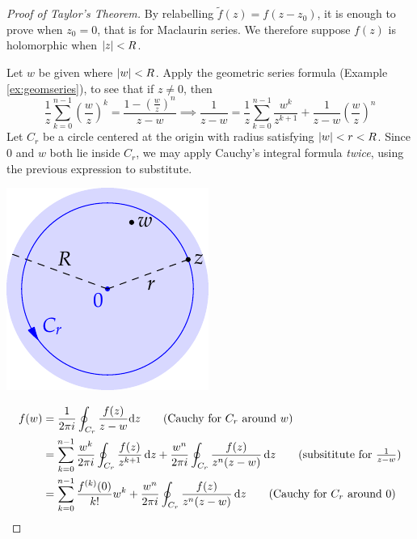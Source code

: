 \begin{proof}[Proof of Taylor's Theorem]
	By relabelling $\tilde f(z)=f(z-z_0)$, it is enough to prove when $z_0=0$, that is for Maclaurin series. We therefore suppose $f(z)$ is holomorphic when $\left| z\right|<R$.\par
	\begin{minipage}[t]{0.74\linewidth}\vspace{-2pt}
		Let $w$ be given where $\left| w\right|<R$. Apply the geometric series formula (Example \ref{ex:geomseries}), to see that if $z\neq 0$, then
		\[
			\frac 1z\sum_{k=0}^{n-1}\left(\frac wz\right)^k
			=\frac{1-\left(\frac wz\right)^n}{z-w} 
			\implies
			\frac 1{z-w}=\frac 1z\sum_{k=0}^{n-1}\frac{w^k}{z^{k+1}}+\frac 1{z-w}\left(\frac wz\right)^n
		\]
		Let $C_r$ be a circle centered at the origin with radius satisfying $\left| w\right|<r<R$. Since 0 and $w$ both lie inside $C_r$, we may apply Cauchy's integral formula \emph{twice}, using the previous expression to substitute. 
	\end{minipage}
	\hfill
	\begin{minipage}[t]{0.25\linewidth}\vspace{-2pt}
		\flushright\includegraphics[scale=0.95]{taylor}
	\end{minipage}\par
	\vspace{-3pt}
	\begin{align*}
		f(w)
		&=\frac 1{2\pi i}\oint_{C_r}\frac{f(z)}{z-w}\dz
			\tag{Cauchy for $C_r$ around $w$}\\
		&=\sum_{k=0}^{n-1}\frac{w^k}{2\pi i}\oint_{C_r}\frac{f(z)}{z^{k+1}}\,\dz
			+\frac{w^n}{2\pi i}\oint_{C_r}\frac{f(z)}{z^n(z-w)}\,\dz
			\tag{subsititute for $\frac 1{z-w}$}\\
	 	&=\sum_{k=0}^{n-1} \frac{f^{(k)}(0)}{k!}w^k 
	 		+\frac{w^n}{2\pi i}\oint_{C_r}\frac{f(z)}{z^n(z-w)}\,\dz
	 		\tag{Cauchy for $C_r$ around $0$}
	\end{align*}

\end{proof}
